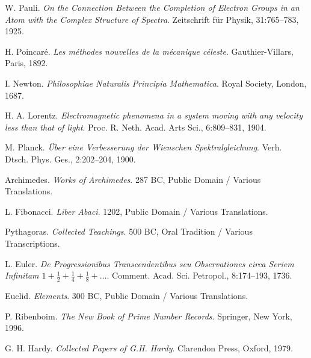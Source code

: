 \documentclass[11pt]{article}
\begin{document}
\begin{thebibliography}{99}

W. Pauli.
\textit{On the Connection Between the Completion of Electron Groups in an Atom with the Complex Structure of Spectra}.
Zeitschrift f\"ur Physik, 31:765--783, 1925.

H. Poincar{\'e}.
\textit{Les m{\'e}thodes nouvelles de la m{\'e}canique c{\'e}leste}.
Gauthier-Villars, Paris, 1892.

I. Newton.
\textit{Philosophiae Naturalis Principia Mathematica}.
Royal Society, London, 1687.

H. A. Lorentz.
\textit{Electromagnetic phenomena in a system moving with any velocity less than that of light}.
Proc. R. Neth. Acad. Arts Sci., 6:809--831, 1904.

M. Planck.
\textit{\"Uber eine Verbesserung der Wienschen Spektralgleichung}.
Verh. Dtsch. Phys. Ges., 2:202--204, 1900.

Archimedes.
\textit{Works of Archimedes}.
287 BC, Public Domain / Various Translations.

L. Fibonacci.
\textit{Liber Abaci}.
1202, Public Domain / Various Translations.

Pythagoras.
\textit{Collected Teachings}.
500 BC, Oral Tradition / Various Transcriptions.

L. Euler.
\textit{De Progressionibus Transcendentibus seu Observationes circa Seriem Infinitam $1 + \frac{1}{2} + \frac{1}{4} + \frac{1}{8} + \dots$}.
Comment. Acad. Sci. Petropol., 8:174--193, 1736.

Euclid.
\textit{Elements}.
300 BC, Public Domain / Various Translations.

P. Ribenboim.
\textit{The New Book of Prime Number Records}.
Springer, New York, 1996.

G. H. Hardy.
\textit{Collected Papers of G.H. Hardy}.
Clarendon Press, Oxford, 1979.

\end{thebibliography}
\end{document}
